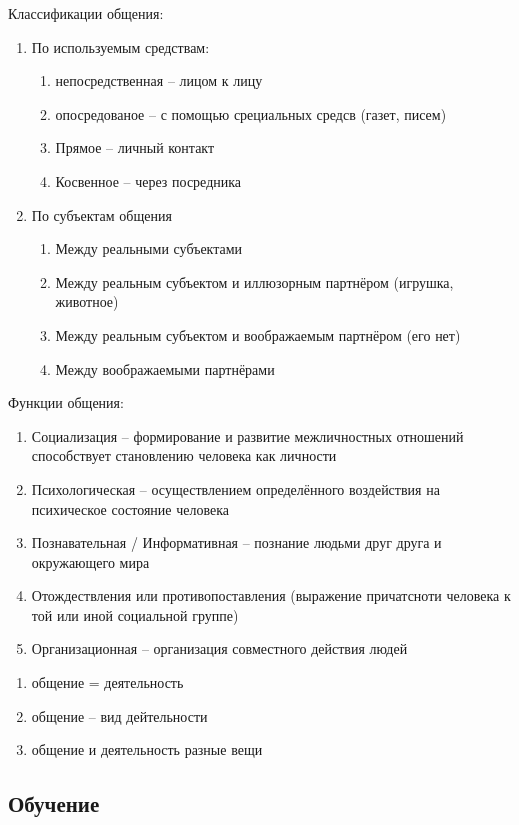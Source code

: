 \documentclass[12pt,a4paper]{book}
\begin{document}
Классификации общения:
\begin{enumerate}
	\item По используемым средствам:
	\begin{enumerate}
		\item непосредственная -- лицом к лицу
		\item опосредованое -- с помощью срециальных средсв (газет, писем) 
		\item Прямое -- личный контакт
		\item Косвенное -- через посредника
	\end{enumerate}
	\item По субъектам общения
	\begin{enumerate}
		\item Между реальными субъектами
		\item Между реальным субъектом и иллюзорным партнёром (игрушка, животное)
		\item Между реальным субъектом и воображаемым партнёром (его нет)
		\item Между воображаемыми партнёрами
	\end{enumerate}
\end{enumerate}
Функции общения:
\begin{enumerate}
	\item Социализация -- формирование и развитие межличностных отношений способствует становлению человека как личности
	\item Психологическая -- осуществлением определённого воздействия на психическое состояние человека
	\item Познавательная / Информативная -- познание людьми друг друга и окружающего мира
	\item Отождествления или противопоставления (выражение причатсноти человека к той или иной социальной группе)
	\item Организационная -- организация совместного действия людей 
\end{enumerate}
\begin{enumerate}
\item общение = деятельность
\item общение -- вид дейтельности
\item общение и деятельность разные вещи
\end{enumerate}

\subsection{Обучение}
\end{document}
